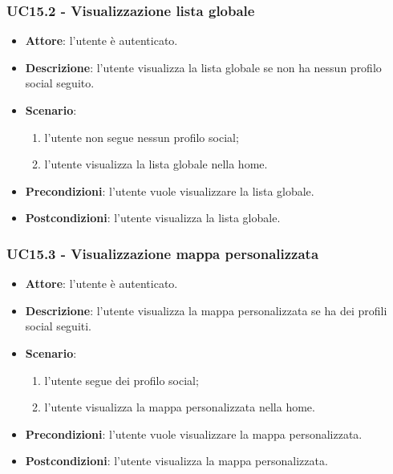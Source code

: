 \subsubsection{UC15.2 - Visualizzazione lista globale}
\begin{itemize}
    \item \textbf{Attore}: l'utente è autenticato.
    \item \textbf{Descrizione}: l'utente visualizza la lista globale se non ha nessun profilo social seguito.
    \item \textbf{Scenario}:
    \begin{enumerate}
        \item l'utente non segue nessun profilo social;
        \item l'utente visualizza la lista globale nella home.
    \end{enumerate}

    \item \textbf{Precondizioni}: l'utente vuole visualizzare la lista globale.
    \item \textbf{Postcondizioni}: l'utente visualizza la lista globale.
\end{itemize}

\subsubsection{UC15.3 - Visualizzazione mappa personalizzata}
\begin{itemize}
    \item \textbf{Attore}: l'utente è autenticato.
    \item \textbf{Descrizione}: l'utente visualizza la mappa personalizzata se ha dei profili social seguiti.
    \item \textbf{Scenario}:
    \begin{enumerate}
        \item l'utente segue dei profilo social;
        \item l'utente visualizza la mappa personalizzata nella home.
    \end{enumerate}

    \item \textbf{Precondizioni}: l'utente vuole visualizzare la mappa personalizzata.
    \item \textbf{Postcondizioni}: l'utente visualizza la mappa personalizzata.
\end{itemize}

